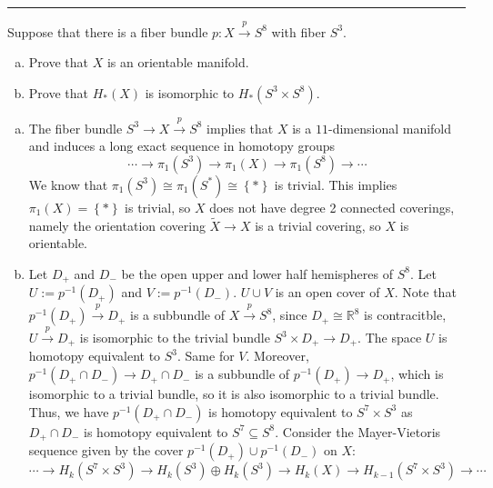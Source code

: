 \documentclass[letterpaper, 12pt]{article}
\begin{document}
\noindent\rule{7in}{2.8pt}
\begin{problem}{3}
Suppose that there is a fiber bundle \(p:X\xrightarrow{p} S^8\) with fiber \(S^3\). 
\begin{enumerate}[(a)]
\item Prove that \(X\) is an orientable manifold.
\item Prove that \(H_*(X)\) is isomorphic to \(H_*(S^3\times S^8)\). 
\end{enumerate}
\end{problem}
\begin{solution}
\begin{enumerate}[(a)]
\item The fiber bundle \(S^3\rightarrow X\xrightarrow{p} S^8\) implies that \(X\) is a \(11\)-dimensional manifold and induces a long exact sequence in homotopy groups 
\[\cdots\rightarrow \pi_1(S^3)\rightarrow \pi_1(X)\rightarrow \pi_1(S^8)\rightarrow \cdots\]
We know that \(\pi_1(S^3)\cong \pi_1(S^*)\cong \left\{ * \right\}\) is trivial. This implies \(\pi_1(X)=\left\{ * \right\}\) is trivial, so \(X\) does not have degree 2 connected coverings, namely the orientation covering \(\tilde{X}\rightarrow X\) is a trivial covering, so \(X\) is orientable. 
\item Let \(D_+\) and \(D_-\) be the open upper and lower half hemispheres of \(S^8\). Let \(U:=p^{-1}(D_+)\) and \(V:=p^{-1}(D_-)\). \(U\cup V\) is an open cover of \(X\). Note that \(p^{-1}(D_+)\xrightarrow{p} D_+\) is a subbundle of \(X\xrightarrow{p} S^8\), since \(D_+\cong \mathbb{R}^8\) is contracitble, \(U\xrightarrow{p} D_+\) is isomorphic to the trivial bundle \(S^3\times D_+\rightarrow D_+\). The space \(U\) is homotopy equivalent to \(S^3\). Same for \(V\). Moreover, \(p^{-1}(D_+\cap D_-)\rightarrow D_+\cap D_-\) is a subbundle of \(p^{-1}(D_+)\rightarrow D_+\), which is isomorphic to a trivial bundle, so it is also isomorphic to a trivial bundle. Thus, we have \(p^{-1}(D_+\cap D_-)\) is homotopy equivalent to \(S^7\times S^3\) as \(D_+\cap D_-\) is homotopy equivalent to \(S^7\subseteq S^8\). Consider the Mayer-Vietoris sequence given by the cover \(p^{-1}(D_+)\cup p^{-1}(D_-)\) on \(X\):
\[\cdots\rightarrow H_k(S^7\times S^3)\rightarrow H_k(S^3)\oplus H_k(S^3)\rightarrow H_k(X)\rightarrow H_{k-1}(S^7\times S^3)\rightarrow \cdots\]

\end{enumerate}
\end{solution}
\end{document}
